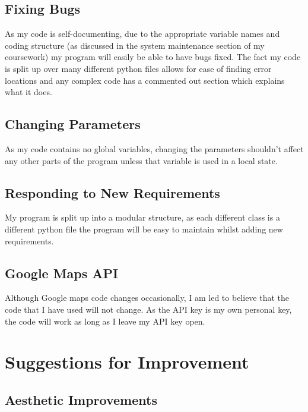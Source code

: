 	\subsection{Fixing Bugs}

As my code is self-documenting, due to the appropriate variable names and coding structure (as discussed in the system maintenance section of my coursework) my program will easily be able to have bugs fixed. The fact my code is split up over many different python files allows for ease of finding error locations and any complex code has a commented out section which explains what it does.

	\subsection{Changing Parameters}

As my code contains no global variables, changing the parameters shouldn't affect any other parts of the program unless that variable is used in a local state. 

	\subsection{Responding to New Requirements}

My program is split up into a modular structure, as each different class is a different python file the program will be easy to maintain whilst adding new requirements. 

	\subsection{Google Maps API}

Although Google maps code changes occasionally, I am led to believe that the code that I have used will not change. As the API key is my own personal key, the code will work as long as I leave my API key open.











\section{Suggestions for Improvement} 

	\subsection{Aesthetic Improvements}

